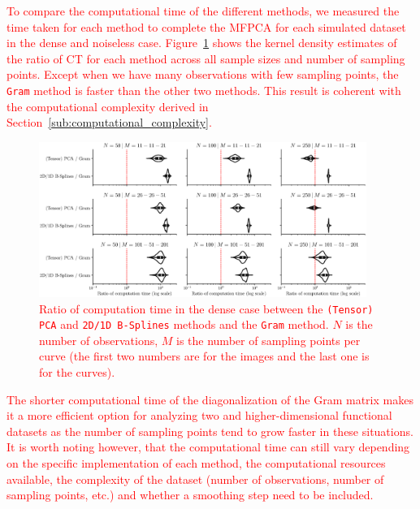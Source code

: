 \begin{results}
\textcolor{red}{To compare the computational time of the different methods, we measured the time taken for each method to complete the MFPCA for each simulated dataset in the dense and noiseless case. Figure~\ref{fig:computation_time_mfd_1d} shows the kernel density estimates of the ratio of CT for each method across all sample sizes and number of sampling points. Except when we have many observations with few sampling points, the \texttt{Gram} method is faster than the other two methods. This result is coherent with the computational complexity derived in Section~\ref{sub:computational_complexity}.}

\begin{figure}
     \centering
    \includegraphics[width=0.95\textwidth]{figures/computation_time.eps}
    \caption{\textcolor{red}{Ratio of computation time in the dense case between the \texttt{(Tensor) PCA} and \texttt{2D/1D B-Splines} methods and the \texttt{Gram} method. $N$ is the number of observations, $M$ is the number of sampling points per curve (the first two numbers are for the images and the last one is for the curves).}}
    \label{fig:computation_time_mfd_1d}
\end{figure}

\textcolor{red}{The shorter computational time of the diagonalization of the Gram matrix makes it a more efficient option for analyzing two and higher-dimensional functional datasets as the number of sampling points tend to grow faster in these situations. It is worth noting however, that the computational time can still vary depending on the specific implementation of each method, the computational resources available, the complexity of the dataset (number of observations, number of sampling points, etc.) and whether a smoothing step need to be included.}
\end{results}

